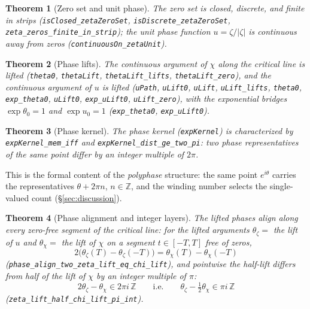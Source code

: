 \documentclass{article}
\newtheorem{theorem}{Theorem}[section]
\newcommand{\Z}{\mathbb{Z}}
\newcommand{\zt}{\zeta}
\newcommand{\Xchi}{\chi}
\begin{document}
\begin{theorem}[Zero set and unit phase]
\label{thm:zeroset}
The zero set is closed, discrete, and finite in strips
(\texttt{isClosed\_zetaZeroSet}, \texttt{isDiscrete\_zetaZeroSet},
\texttt{zeta\_zeros\_finite\_in\_strip}); the unit phase function
$u=\zt/|\zt|$ is continuous away from zeros
(\texttt{continuousOn\_zetaUnit}).
\end{theorem}

\begin{theorem}[Phase lifts]
\label{thm:lifts}
The continuous argument of $\Xchi$ along the critical line is lifted
(\texttt{theta0}, \texttt{thetaLift}, \texttt{thetaLift\_lifts},
\texttt{thetaLift\_zero}), and the continuous argument of $u$ is lifted
(\texttt{uPath}, \texttt{uLift0}, \texttt{uLift}, \texttt{uLift\_lifts}, \texttt{theta0}, \texttt{exp\_theta0}, \texttt{uLift0}, \texttt{exp\_uLift0},
\texttt{uLift\_zero}), with the exponential bridges
$\exp\theta_0=1$ and $\exp u_0=1$ (\texttt{exp\_theta0},
\texttt{exp\_uLift0}).
\end{theorem}

\begin{theorem}[Phase kernel]
\label{thm:kernel}
The phase kernel (\texttt{expKernel}) is characterized by
\texttt{expKernel\_mem\_iff} and \texttt{expKernel\_dist\_ge\_two\_pi}: two
phase representatives of the same point differ by an integer multiple of
$2\pi$.
\end{theorem}

This is the formal content of the \emph{polyphase} structure: the same
point $e^{i\theta}$ carries the representatives $\theta+2\pi n$,
$n\in\Z$, and the winding number selects the single-valued count
(\S\ref{sec:discussion}).

\begin{theorem}[Phase alignment and integer layers]
\label{thm:align}
The lifted phases align along every zero-free segment of the critical
line: for the lifted arguments $\theta_{\zt}=$ the lift of $u$ and
$\theta_{\Xchi}=$ the lift of $\Xchi$ on a segment $t\in[-T,T]$ free of
zeros,
\begin{equation}
\label{eq:align}
2\bigl(\theta_{\zt}(T)-\theta_{\zt}(-T)\bigr)=\theta_{\Xchi}(T)-\theta_{\Xchi}(-T)
\end{equation}
(\texttt{phase\_align\_two\_zeta\_lift\_eq\_chi\_lift}), and pointwise
the half-lift differs from half of the lift of $\Xchi$ by an integer
multiple of $\pi$:
\begin{equation}
\label{eq:layers}
2\theta_{\zt}-\theta_{\Xchi}\in 2\pi i\,\Z
\qquad\text{i.e.}\qquad
\theta_{\zt}-\tfrac12\theta_{\Xchi}\in\pi i\,\Z
\end{equation}
(\texttt{zeta\_lift\_half\_chi\_lift\_pi\_int}).
\end{theorem}
\end{document}
